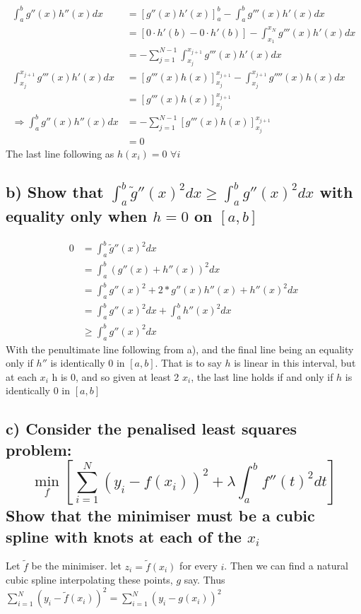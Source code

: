 \begin{align*}
    \int_a^b g''(x)h''(x) dx &= [g''(x)h'(x)]_a^b - \int_a^b g'''(x) h'(x) dx \\
    &= [0 \cdot h'(b) - 0 \cdot h'(b)] - \int_{x_1}^{x_N} g'''(x) h'(x) dx \\
    &= -\sum_{j = 1}^{N-1} \int_{x_j}^{x_{j+1}} g'''(x) h'(x) dx \\
    \int_{x_j}^{x_{j+1}} g'''(x) h'(x) dx &=  [g'''(x)h(x)]^{x_{j+1}}_{x_j}  - \int_{x_j}^{x_{j+1}} g''''(x) h(x) dx \\
    &=  [g'''(x)h(x)]^{x_{j+1}}_{x_j}  \\
    \Rightarrow  \int_a^b g''(x)h''(x) dx &= -\sum_{j = 1}^{N-1} [g'''(x)h(x)]^{x_{j+1}}_{x_j} \\
    &= 0
\end{align*}
The last line following as $h(x_i) = 0$ $\forall i$


\subsection*{b) Show that $\int_a^b \tilde{g}''(x)^2  dx \geq \int_a^b g''(x)^2 dx$ with equality only when $h = 0$ on $[a,b]$}
\begin{align*}
    0 &= \int_a^b \tilde{g}''(x)^2  dx \\
    &= \int_a^b \left(g''(x) + h''(x)\right)^2 dx \\
    &= \int_a^b g''(x)^2  + 2 * g''(x) h''(x) + h''(x)^2 dx\\
    &= \int_a^b g''(x)^2 dx +  \int_a^b  h''(x)^2 dx \\
    &\geq \int_a^b g''(x)^2 dx
\end{align*}
With the penultimate line following from a), and the final line being an equality only if $ h''$ is identically 0 in $[a,b]$. That is to say $h$ is linear in this interval, but at each $x_i$ h is $0$, and so given at least 2 $x_i$, the last line holds if and only if $h$ is identically $0$ in $[a,b]$ 


\subsection*{c) Consider the penalised least squares problem:
$$ \min_f \left[ \sum_{i=1}^N \left(y_i - f(x_i)\right)^2 + \lambda \int_a^b f''(t)^2 dt \right]$$
Show that the minimiser must be a cubic spline with knots at each of the $x_i$}

Let $\tilde{f}$ be the minimiser. let $z_i = \tilde{f}(x_i)$ for every $i$. 
Then we can find a natural cubic spline interpolating these points, $g$ say.
Thus $\sum_{i=1}^N \left(y_i - \tilde{f}(x_i)\right)^2 = \sum_{i=1}^N \left(y_i - g(x_i)\right)^2$

